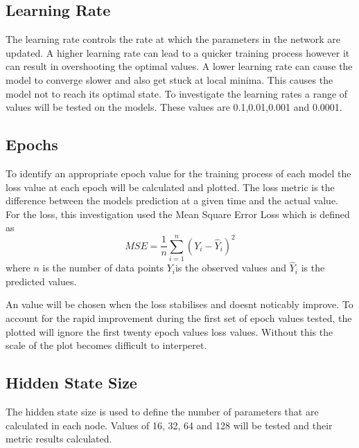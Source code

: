 \documentclass[10pt,twocolumn,letterpaper]{article}
\begin{document}
\subsection{Learning Rate}
The learning rate controls the rate at which the parameters in the network are updated.
A higher learning rate can lead to a quicker training process however it can result 
in overshooting the optimal values. A lower learning rate can cause the model to 
converge slower and also get stuck at local minima. This causes the model not to reach 
its optimal state. To investigate the learning rates a range of values will be tested 
on the models. These values are 0.1,0.01,0.001 and 0.0001.
\subsection{Epochs}
To identify an appropriate epoch value for the training process of each model the loss 
value at each epoch will be calculated and plotted. The loss metric is the difference 
between the models prediction at a given time and the actual value. For the loss, this 
investigation used the Mean Square Error Loss which is defined as
\begin{equation}
   MSE = \dfrac{1}{n}\sum_{i=1}^{n}(Y_i - \hat{Y}_i)^2
\end{equation}
where $n$ is the number of data points $Y_i$is the observed values and $\hat{Y}_{i}$
is the predicted values.

An value will be chosen when the loss stabilises and doesnt noticably improve. To 
account for the rapid improvement during the first set of epoch values tested, the plotted 
will ignore the first twenty epoch values loss values. Without this the scale of the plot
becomes difficult to interperet.

\subsection{Hidden State Size}
The hidden state size is used to define the number of parameters that are calculated 
in each node. Values of 16, 32, 64 and 128 will be tested and their metric results 
calculated.
\end{document}
